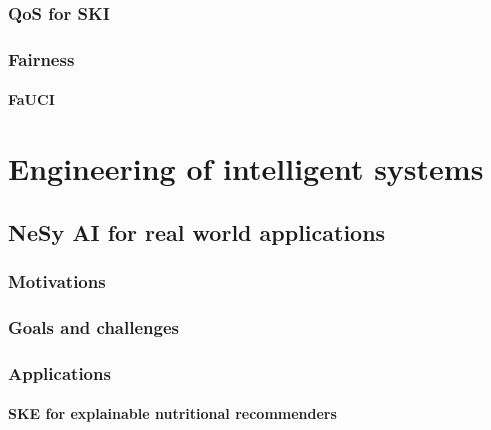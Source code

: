 \documentclass[12pt,a4paper,openright,twoside]{book}
\begin{document}
\section{\Acl{QoS} for \ac{SKI}}\label{sec:qos}

\section{Fairness}\label{sec:fairness}

\subsection{\Acl{FaUCI}}\label{subsec:fauci}


\part{Engineering of intelligent systems}\label{part:engineering-of-intelligent-systems}


\chapter{\Ac{NeSy} \ac{AI} for real world applications}\label{ch:nesy-ai-for-real-world-applications}

\section{Motivations}\label{sec:nesy-ai-motivations}

\section{Goals and challenges}\label{sec:nesy-ai-goals-and-challenges}

\section{Applications}\label{sec:nesy-ai-applications}

\subsection{\Ac{SKE} for explainable nutritional recommenders}\label{subsec:ske-for-explainable-nutritional-recommenders}
\end{document}
